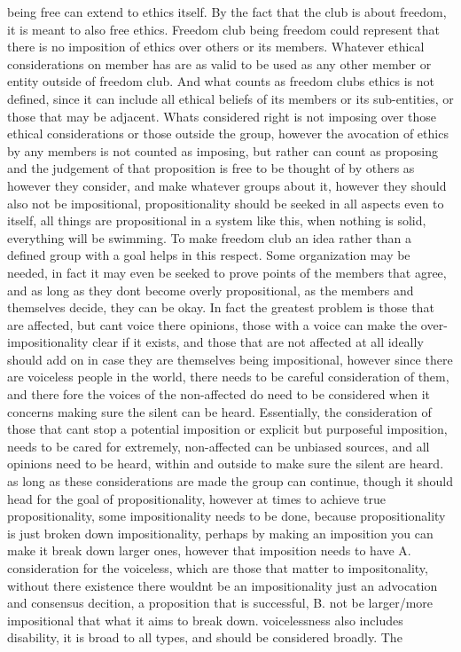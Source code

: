 \documentclass[letter]{article}
\begin{document}
being free can extend to ethics itself. By the fact that the club is about freedom, it is meant to also free ethics. Freedom club being freedom could represent that there is no imposition of ethics over others or its members. Whatever ethical considerations on member has are as valid to be used as any other member or entity outside of freedom club. And what counts as freedom clubs ethics is not defined, since it can include all ethical beliefs of its members or its sub-entities, or those that may be adjacent. Whats considered right is not imposing over those ethical considerations or those outside the group, however the avocation of ethics by any members is not counted as imposing, but rather can count as proposing and the judgement of that proposition is free to be thought of by others as however they consider, and make whatever groups about it, however they should also not be impositional, propositionality should be seeked in all aspects even to itself, all things are propositional in a system like this, when nothing is solid, everything will be swimming.
To make freedom club an idea rather than a defined group with a goal helps in this respect. Some organization may be needed, in fact it may even be seeked to prove points of the members that agree, and as long as they dont become overly propositional, as the members and themselves decide, they can be okay. In fact the greatest problem is those that are affected, but cant voice there opinions, those with a voice can make the over-impositionality clear if it exists, and those that are not affected at all ideally should add on in case they are themselves being impositional, however since there are voiceless people in the world, there needs to be careful consideration of them, and there fore the voices of the non-affected do need to be considered when it concerns making sure the silent can be heard. Essentially, the consideration of those that cant stop a potential imposition or explicit but purposeful imposition, needs to be cared for extremely, non-affected can be unbiased sources, and all opinions need to be heard, within and outside to make sure the silent are heard. as long as these considerations are made the group can continue, though it should head for the goal of propositionality, however at times to achieve true propositionality, some impositionality needs to be done, because propositionality is just broken down impositionality, perhaps by making an imposition you can make it break down larger ones, however that imposition needs to have A. consideration for the voiceless, which are those that matter to impositonality, without there existence there wouldnt be an impositionality just an advocation and consensus decition, a proposition that is successful, B. not be larger/more impositional that what it aims to break down. voicelessness also includes disability, it is broad to all types, and should be considered broadly. The
\end{document}
